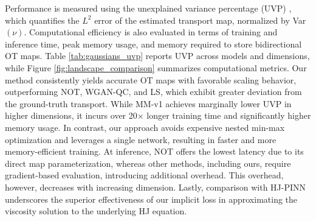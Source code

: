\documentclass{article} %
\theoremstyle{plain}
\theoremstyle{definition}
\theoremstyle{remark}
\begin{document}
Performance is measured using the unexplained variance percentage (UVP) \citep{korotin2019wasserstein}, which quantifies the $L^2$ error of the estimated transport map, normalized by Var$(\nu)$. Computational efficiency is also evaluated in terms of training and inference time, peak memory usage, and memory required to store bidirectional OT maps.
Table \ref{tab:gaussians_uvp} reports UVP across models and dimensions, while Figure \ref{fig:landscape_comparison} summarizes computational metrics. 
Our method consistently yields accurate OT maps with favorable scaling behavior, outperforming NOT, WGAN-QC, and LS, which exhibit greater deviation from the ground-truth transport. While MM-v1 achieves marginally lower UVP in higher dimensions, it incurs over 20× longer training time and significantly higher memory usage. In contrast, our approach avoids expensive nested min-max optimization and leverages a single network, resulting in faster and more memory-efficient training.
At inference, NOT offers the lowest latency due to its direct map parameterization, whereas other methods, including ours, require gradient-based evaluation, introducing additional overhead. This overhead, however, decreases with increasing dimension. Lastly, comparison with HJ-PINN underscores the superior effectiveness of our implicit loss in approximating the viscosity solution to the underlying HJ equation.

\begin{table}[t]
\centering
\vspace{-2mm}
\caption{\textit{Quantitative evaluation on Gaussian distributions.} UVP $(\downarrow)$  is measured across different OT methods as the data dimension $d$ increases. }
\label{tab:gaussians_uvp}
\end{table}
\end{document}
